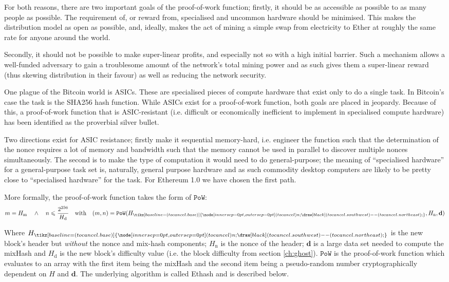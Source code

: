 \documentclass[9pt,oneside]{amsart}
\newcommand{\hcancel}[1]{%
    \tikz[baseline=(tocancel.base)]{
        \node[inner sep=0pt,outer sep=0pt] (tocancel) {#1};
        \draw[black] (tocancel.south west) -- (tocancel.north east);
    }%
}%
\begin{document}
\begin{multicols}{2}
For both reasons, there are two important goals of the proof-of-work function; firstly, it should be as accessible as possible to as many people as possible. The requirement of, or reward from, specialised and uncommon hardware should be minimised. This makes the distribution model as open as possible, and, ideally, makes the act of mining a simple swap from electricity to Ether at roughly the same rate for anyone around the world.

Secondly, it should not be possible to make super-linear profits, and especially not so with a high initial barrier. Such a mechanism allows a well-funded adversary to gain a troublesome amount of the network's total mining power and as such gives them a super-linear reward (thus skewing distribution in their favour) as well as reducing the network security.

One plague of the Bitcoin world is ASICs. These are specialised pieces of compute hardware that exist only to do a single task. In Bitcoin's case the task is the SHA256 hash function. While ASICs exist for a proof-of-work function, both goals are placed in jeopardy. Because of this, a proof-of-work function that is ASIC-resistant (i.e. difficult or economically inefficient to implement in specialised compute hardware) has been identified as the proverbial silver bullet.

Two directions exist for ASIC resistance; firstly make it sequential memory-hard, i.e. engineer the function such that the determination of the nonce requires a lot of memory and bandwidth such that the memory cannot be used in parallel to discover multiple nonces simultaneously. The second is to make the type of computation it would need to do general-purpose; the meaning of ``specialised hardware''  for a general-purpose task set is, naturally, general purpose hardware and as such commodity desktop computers are likely to be pretty close to ``specialised hardware'' for the task. For Ethereum 1.0 we have chosen the first path.

More formally, the proof-of-work function takes the form of $\mathtt{PoW}$:
\begin{equation}
m = H_{\mathrm{m}} \quad \wedge \quad n \leqslant \frac{2^{256}}{H_{\mathrm{d}}} \quad \text{with} \quad (m, n) = \mathtt{PoW}(H_{\hcancel{n}}, H_{\mathrm{n}}, \mathbf{d})
\end{equation}

Where $H_{\hcancel{n}}$ is the new block's header but \textit{without} the nonce and mix-hash components; $H_{\mathrm{n}}$ is the nonce of the header; $\mathbf{d}$ is a large data set needed to compute the mixHash and $H_{\mathrm{d}}$ is the new block's difficulty value (i.e. the block difficulty from section \ref{ch:ghost}). $\mathtt{PoW}$ is the proof-of-work function which evaluates to an array with the first item being the mixHash and the second item being a pseudo-random number cryptographically dependent on $H$ and $\mathbf{d}$. The underlying algorithm is called Ethash and is described below.

\end{multicols}
\end{document}
